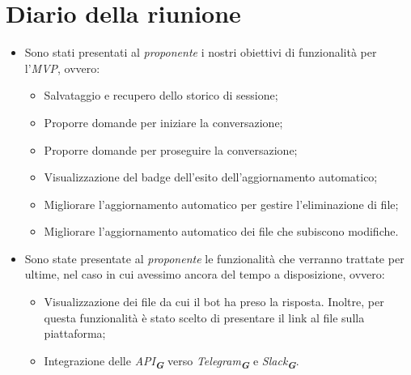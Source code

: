 
\section{Diario della riunione}

\begin{itemize}
    \item Sono stati presentati al \emph{proponente} i nostri obiettivi di funzionalità per l'\emph{MVP}, ovvero: 
        \begin{itemize}
            \item Salvataggio e recupero dello storico di sessione;
            \item Proporre domande per iniziare la conversazione;
            \item Proporre domande per proseguire la conversazione;
            \item Visualizzazione del badge dell’esito dell’aggiornamento automatico;
            \item Migliorare l’aggiornamento automatico per gestire l’eliminazione di file;
            \item Migliorare l’aggiornamento automatico dei file che subiscono modifiche.
        \end{itemize}
    \item Sono state presentate al \emph{proponente} le funzionalità che verranno trattate per ultime, nel caso in cui avessimo
    ancora del tempo a disposizione, ovvero:
        \begin{itemize}
            \item Visualizzazione dei file da cui il bot ha preso la risposta. Inoltre, per questa funzionalità è stato scelto di
            presentare il link al file sulla piattaforma;
            \item Integrazione delle \emph{API}\textsubscript{\textbf{\textit{G}}} verso
            \emph{Telegram}\textsubscript{\textbf{\textit{G}}} e \emph{Slack}\textsubscript{\textbf{\textit{G}}}.
        \end{itemize}


\end{itemize}
